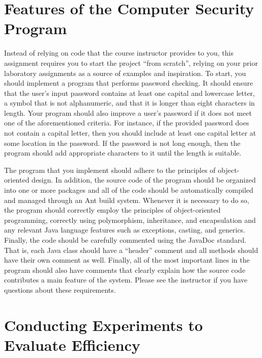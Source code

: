 \vspace*{-.05in}
\section*{Features of the Computer Security Program}
\vspace*{-.05in}

Instead of relying on code that the course instructor provides to you, this assignment requires you to start the project
``from scratch'', relying on your prior laboratory assignments as a source of examples and inspiration. To start, you
should implement a program that performs password checking. It should ensure that the user's input password contains at
least one capital and lowercase letter, a symbol that is not alphanumeric, and that it is longer than eight characters
in length. Your program should also improve a user's password if it does not meet one of the aforementioned criteria.
For instance, if the provided password does not contain a capital letter, then you should include at least one capital
letter at some location in the password. If the password is not long enough, then the program should add appropriate
characters to it until the length is suitable.

The program that you implement should adhere to the principles of object-oriented design. In addition, the source code
of the program should be organized into one or more packages and all of the code should be automatically compiled and
managed through an Ant build system. Whenever it is necessary to do so, the program should correctly employ the
principles of object-oriented programming, correctly using polymorphism, inheritance, and encapsulation and any relevant
Java language features such as exceptions, casting, and generics. Finally, the code should be carefully commented using
the JavaDoc standard. That is, each Java class should have a ``header'' comment and all methods should have their own
comment as well. Finally, all of the most important lines in the program should also have comments that clearly explain
how the source code contributes a main feature of the system. Please see the instructor if you have questions about
these requirements.

\vspace*{-.05in}
\section*{Conducting Experiments to Evaluate Efficiency}
\vspace*{-.05in}

